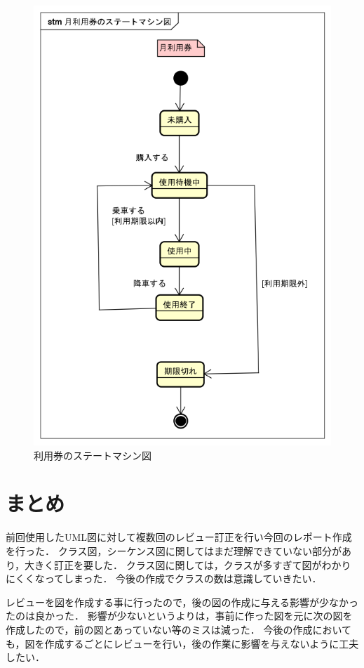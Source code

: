 \documentclass[documentclass]{jsarticle}
\begin{document}
\begin{figure}[h]
\begin{minipage}[b]{0.49\columnwidth}
      \includegraphics[width=0.9\columnwidth]{figure/8-2.png}
      \caption{利用券のステートマシン図}
      \label{fig:8-2}
  \end{minipage}
  \end{figure}


\section{まとめ}
前回使用したUML図に対して複数回のレビュー訂正を行い今回のレポート作成を行った．
クラス図，シーケンス図に関してはまだ理解できていない部分があり，大きく訂正を要した．
クラス図に関しては，クラスが多すぎて図がわかりにくくなってしまった．
今後の作成でクラスの数は意識していきたい．

レビューを図を作成する事に行ったので，後の図の作成に与える影響が少なかったのは良かった．
影響が少ないというよりは，事前に作った図を元に次の図を作成したので，前の図とあっていない等のミスは減った．
今後の作成においても，図を作成するごとにレビューを行い，後の作業に影響を与えないように工夫したい．
\end{document}
